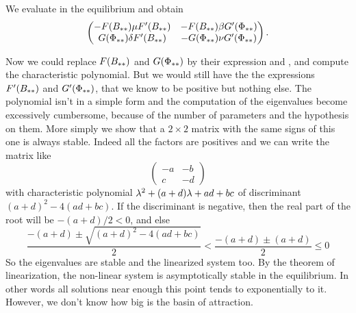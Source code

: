 We evaluate in the equilibrium and obtain
$$ \begin{pmatrix}
     - F(B_{**})\mu F'(B_{**}) & -F(B_{**})\beta G'(\Phi_{**})
    \\
    G(\Phi_{**})\delta F'(B_{**})   & -G(\Phi_{**})\nu G'(\Phi_{**})
\end{pmatrix}. $$

Now we could replace $F(B_{**})$ and $G(\Phi_{**})$ by their expression  and , and compute the characteristic polynomial. But we would still have the the expressions $F'(B_{**})$ and $G'(\Phi_{**})$, that we know to be positive but nothing else. The polynomial isn't in a simple form and the computation of the eigenvalues become excessively cumbersome, because of the number of parameters and the hypothesis on them. More simply we show that a $2\times2$ matrix with the same signs of this one is always stable. Indeed all the factors are positives and we can write the matrix like
$$\begin{pmatrix}-a&-b\\c&-d\end{pmatrix}$$
with characteristic polynomial $\lambda^2+(a+d)\lambda+ad+bc$ of discriminant $(a+d)^2-4(ad+bc)$. If the discriminant is negative, then the real part of the root will be $-(a+d)/2<0$, and else $$\frac{-(a+d)\pm\sqrt{(a+d)^2-4(ad+bc)}}{2} 
< \frac{-(a+d) \pm (a+d) }{2} \leq 0$$
So the eigenvalues are stable and the linearized system too. By the theorem of linearization, the non-linear system is asymptotically stable in the equilibrium. In other words all solutions near enough this point tends to exponentially to it. However, we don't know how big is the basin of attraction.

